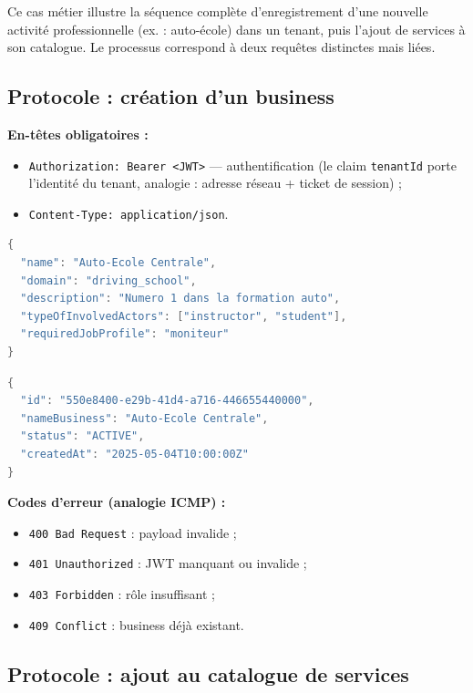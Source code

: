 \documentclass[12pt,a4paper]{report}
\theoremstyle{definition}
\theoremstyle{remark}
\newcommand{\jwt}{\textsc{JWT}}
\begin{document}
Ce cas métier illustre la séquence complète d'enregistrement d'une nouvelle activité professionnelle (ex. : auto-école) dans un tenant, puis l'ajout de services à son catalogue. Le processus correspond à deux requêtes distinctes mais liées.

\subsection{Protocole : création d'un business}

\begin{infobox}
	\textbf{En-têtes obligatoires :}
	\begin{itemize}
		\item \texttt{Authorization: Bearer <JWT>} — authentification (le claim \texttt{tenantId} porte l'identité du tenant, analogie : adresse réseau + ticket de session) ;
		\item \texttt{Content-Type: application/json}.
	\end{itemize}
\end{infobox}

\begin{lstlisting}[language=java, caption=Corps de la requête (payload)]
{
  "name": "Auto-Ecole Centrale",
  "domain": "driving_school",
  "description": "Numero 1 dans la formation auto",
  "typeOfInvolvedActors": ["instructor", "student"],
  "requiredJobProfile": "moniteur"
}
\end{lstlisting}

\begin{lstlisting}[language=java, caption=Réponse (succès — 201 Created)]
{
  "id": "550e8400-e29b-41d4-a716-446655440000",
  "nameBusiness": "Auto-Ecole Centrale",
  "status": "ACTIVE",
  "createdAt": "2025-05-04T10:00:00Z"
}
\end{lstlisting}

\textbf{Codes d'erreur (analogie ICMP) :}
\begin{itemize}
	\item \texttt{400 Bad Request} : payload invalide ;
	\item \texttt{401 Unauthorized} : \jwt{} manquant ou invalide ;
	\item \texttt{403 Forbidden} : rôle insuffisant ;
	\item \texttt{409 Conflict} : business déjà existant.
\end{itemize}

\subsection{Protocole : ajout au catalogue de services}
\end{document}
